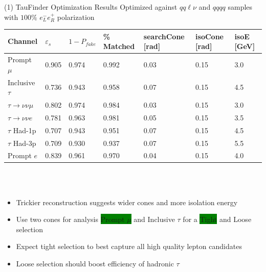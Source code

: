 \documentclass[10pt]{beamer}
\begin{document}
\begin{frame}{(1) TauFinder Optimization Results}
\scriptsize
Optimized against $qq\ell \nu$ and $qqqq$ samples with $100\% \, \, e^-_L e^+_R$ polarization 
\begin{tabular}{|p{}|p{}p{}p{}p{}p{}p{}|}

\hline 
\rowcolor{lightgray}
Channel & $\varepsilon_s$ & $1-P_{fake}$ & \% Matched & searchCone [rad] & isoCone [rad] & isoE [GeV] \\ 
\hline 
\rowcolor{green}
Prompt $\mu$ & 0.905 & 0.974 & 0.992 & 0.03 & 0.15 & 3.0 \\ 
\rowcolor{emerald}
Inclusive $\tau$ & 0.736 & 0.943 & 0.958 & 0.07 & 0.15 & 4.5 \\ 
 
$\tau \rightarrow \nu \nu \mu$ & 0.802 & 0.974 & 0.984 & 0.03 & 0.15 & 3.0 \\ 
 
$\tau \rightarrow \nu \nu e$ & 0.781 & 0.963 & 0.981 & 0.05 & 0.15 & 3.5 \\ 
 
$\tau$ Had-1p & 0.707 & 0.943 & 0.951 & 0.07 & 0.15 & 4.5 \\ 
 
$\tau$ Had-3p & 0.709 & 0.930 & 0.937 & 0.07 & 0.15 & 5.5 \\ 
 
Prompt $e$ & 0.839 & 0.961 & 0.970 & 0.04 & 0.15 & 4.0 \\ 
\hline 
\end{tabular} 
\quad \quad \\
\quad \quad \\
\begin{itemize}
\item Trickier reconstruction suggests wider cones and more isolation energy
\item Use two cones for analysis \colorbox{green}{Prompt $\mu$} and \colorbox{emerald}{Inclusive $\tau$} for a \colorbox{green}{Tight} and \colorbox{emerald}{Loose} selection
\item Expect tight selection to best capture all high quality lepton candidates
\item Loose selection should boost efficiency of hadronic $\tau$
\end{itemize}




\end{frame}
\end{document}
